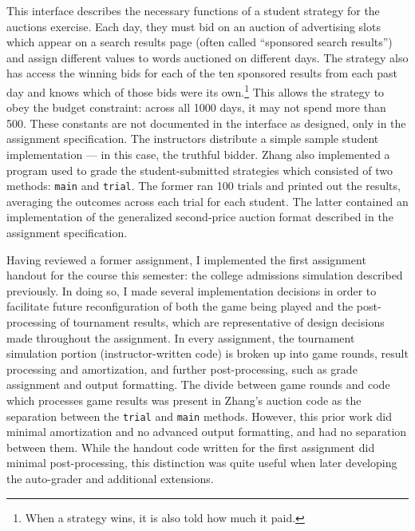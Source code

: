 \documentclass[pageno]{jpaper}
\begin{document}
This interface describes the necessary functions of a student strategy for the auctions exercise.
Each day, they must bid on an auction of advertising slots which appear on a search results page (often called ``sponsored search results'') and assign different values to words auctioned on different days.
The strategy also has access the winning bids for each of the ten sponsored results from each past day and knows which of those bids were its own.\footnote{When a strategy wins, it is also told how much it paid.}
This allows the strategy to obey the budget constraint: across all 1000 days, it may not spend more than 500.
These constants are not documented in the interface as designed, only in the assignment specification.
The instructors distribute a simple sample student implementation --- in this case, the truthful bidder.
Zhang also implemented a program used to grade the student-submitted strategies which consisted of two methods: \texttt{main} and \texttt{trial}.
The former ran 100 trials and printed out the results, averaging the outcomes across each trial for each student.
The latter contained an implementation of the generalized second-price auction format described in the assignment specification.

Having reviewed a former assignment, I implemented the first assignment handout for the course this semester: the college admissions simulation described previously.
In doing so, I made several implementation decisions in order to facilitate future reconfiguration of both the game being played and the post-processing of tournament results, which are representative of design decisions made throughout the assignment.
In every assignment, the tournament simulation portion (instructor-written code) is broken up into game rounds, result processing and amortization, and further post-processing, such as grade assignment and output formatting.
The divide between game rounds and code which processes game results was present in Zhang's auction code as the separation between the \texttt{trial} and \texttt{main} methods.
However, this prior work did minimal amortization and no advanced output formatting, and had no separation between them.
While the handout code written for the first assignment did minimal post-processing, this distinction was quite useful when later developing the auto-grader and additional extensions.
\end{document}
